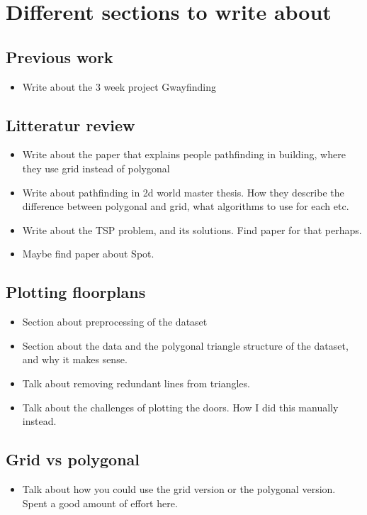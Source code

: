 \section{Different sections to write about}

\subsection{Previous work}
\begin{itemize}
    \item Write about the 3 week project Gwayfinding
\end{itemize}

\subsection{Litteratur review}
\begin{itemize}
    \item Write about the paper that explains people pathfinding in building, where they use grid instead of polygonal
    \item Write about pathfinding in 2d world master thesis. How they describe the difference between polygonal and grid, what algorithms to use for each etc.
    \item Write about the TSP problem, and its solutions. Find paper for that perhaps.
    \item Maybe find paper about Spot.
\end{itemize}


\subsection{Plotting floorplans}
\begin{itemize}
    \item Section about preprocessing of the dataset
    \item Section about the data and the polygonal triangle structure of the dataset, and why it makes sense.
    \item Talk about removing redundant lines from triangles.
    \item Talk about the challenges of plotting the doors. How I did this manually instead.
\end{itemize}

\subsection{Grid vs polygonal}
\begin{itemize}
    \item Talk about how you could use the grid version or the polygonal version. Spent a good amount of effort here.
\end{itemize}

